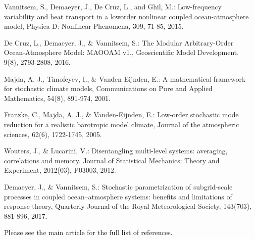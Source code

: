 \begin{DoxyItemize}
\item Vannitsem, S., Demaeyer, J., De Cruz, L., and Ghil, M.\+: Low-\/frequency variability and heat transport in a loworder nonlinear coupled ocean-\/atmosphere model, Physica D\+: Nonlinear Phenomena, 309, 71-\/85, 2015.
\item De Cruz, L., Demaeyer, J., \& Vannitsem, S.\+: The Modular Arbitrary-\/\+Order Ocean-\/\+Atmosphere Model\+: M\+A\+O\+O\+AM v1., Geoscientific Model Development, 9(8), 2793-\/2808, 2016.
\item Majda, A. J., Timofeyev, I., \& Vanden Eijnden, E.\+: A mathematical framework for stochastic climate models, Communications on Pure and Applied Mathematics, 54(8), 891-\/974, 2001.
\item Franzke, C., Majda, A. J., \& Vanden-\/\+Eijnden, E.\+: Low-\/order stochastic mode reduction for a realistic barotropic model climate, Journal of the atmospheric sciences, 62(6), 1722-\/1745, 2005.
\item Wouters, J., \& Lucarini, V.\+: Disentangling multi-\/level systems\+: averaging, correlations and memory. Journal of Statistical Mechanics\+: Theory and Experiment, 2012(03), P03003, 2012.
\item Demaeyer, J., \& Vannitsem, S.\+: Stochastic parametrization of subgrid-\/scale processes in coupled ocean–atmosphere systems\+: benefits and limitations of response theory, Quarterly Journal of the Royal Meteorological Society, 143(703), 881-\/896, 2017.
\end{DoxyItemize}

Please see the main article for the full list of references. 